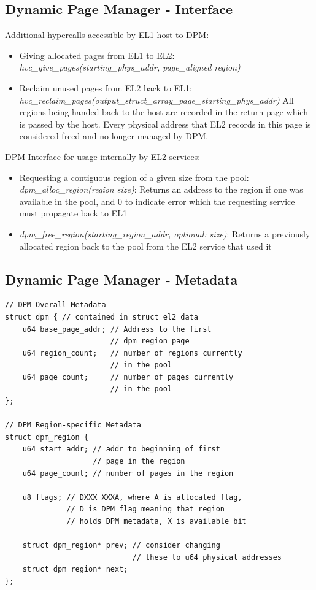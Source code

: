 \subsection{Dynamic Page Manager - Interface}
Additional hypercalls accessible by EL1 host to DPM:

\begin{itemize}
\item Giving allocated pages from EL1 to EL2:
\textit{hvc\_give\_pages(starting\_phys\_addr, page\_aligned region)}
\item Reclaim unused pages from EL2 back to EL1:
\textit{hvc\_reclaim\_pages(output\_struct\_array\_page\_starting\_phys\_addr)}
All regions being handed back to the host are recorded in the return page which is
passed by the host. Every physical address that EL2 records in this page is considered
freed and no longer managed by DPM.
\end{itemize}

DPM Interface for usage internally by EL2 services:
\begin{itemize}
\item Requesting a contiguous region of a given size from the pool:
\textit{dpm\_alloc\_region(region size)}:
	Returns an address to the region if one was available in the pool,
    and 0 to indicate error which the requesting service must propagate back to EL1
\item
\textit{dpm\_free\_region(starting\_region\_addr, optional: size)}:
Returns a previously allocated region back to the pool from the EL2 service that used it
\end{itemize}

\subsection{Dynamic Page Manager - Metadata}
\begin{verbatim}
// DPM Overall Metadata
struct dpm { // contained in struct el2_data
    u64 base_page_addr; // Address to the first
                        // dpm_region page
    u64 region_count;   // number of regions currently
                        // in the pool
    u64 page_count;     // number of pages currently
                        // in the pool
};

// DPM Region-specific Metadata
struct dpm_region {
    u64 start_addr; // addr to beginning of first
                    // page in the region
    u64 page_count; // number of pages in the region

    u8 flags; // DXXX XXXA, where A is allocated flag,
              // D is DPM flag meaning that region
              // holds DPM metadata, X is available bit

    struct dpm_region* prev; // consider changing
                             // these to u64 physical addresses
    struct dpm_region* next;
};
\end{verbatim}

